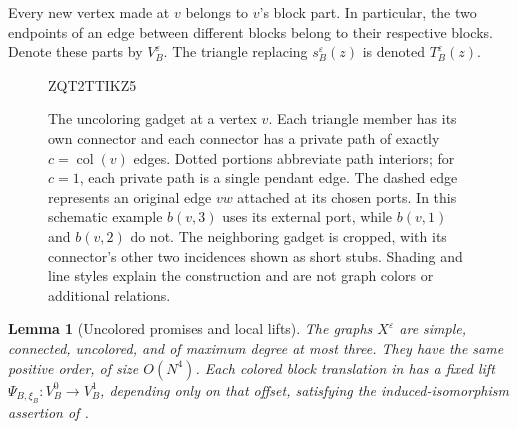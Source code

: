 \documentclass[11pt]{article}
\newtheorem{lemma}[theorem]{Lemma}
\theoremstyle{definition}
\begin{document}
Every new vertex made at \(v\) belongs to \(v\)'s block part.
In particular, the two endpoints of an edge between different blocks
belong to their respective blocks.
Denote these parts by \(V_B^\varepsilon\).
The triangle replacing \(s_B^\varepsilon(z)\) is denoted \(T_B^\varepsilon(z)\).

\begin{figure}[tb]

ZQT2TTIKZ5
\caption{The uncoloring gadget at a vertex \(v\).
Each triangle member has its own connector and each connector
has a private path of exactly \(c=\operatorname{col}(v)\) edges.
Dotted portions abbreviate path interiors; for \(c=1\), each private
path is a single pendant edge.
The dashed edge represents an original edge \(vw\) attached at its
chosen ports.  In this schematic example \(b(v,3)\) uses its external
port, while \(b(v,1)\) and \(b(v,2)\) do not.
The neighboring gadget is cropped, with its connector's other two
incidences shown as short stubs.
Shading and line styles explain the construction and are not graph
colors or additional relations.}
\label{graph:fig-uncoloring}
\end{figure}


\begin{lemma}[Uncolored promises and local lifts]
\label{graph:uncolored-lifts}
The graphs \(X^\varepsilon\) are simple, connected, uncolored, and of maximum
degree at most three.  They have the same positive order, of size
\(O(N^4)\).
Each colored block translation in 
has a fixed lift \(\Psi_{B,\xi_B}:V_B^0\to V_B^1\), depending only
on that offset, satisfying the induced-isomorphism assertion of
.
\end{lemma}
\end{document}
